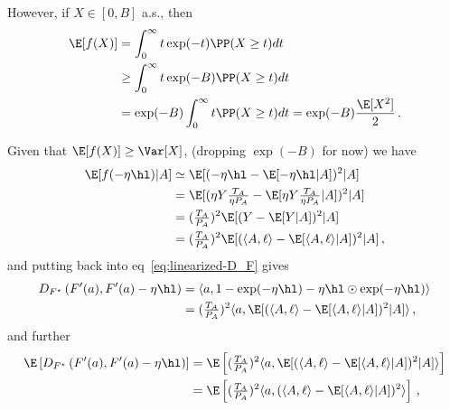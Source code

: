 However, if $X \in [0, B]$ a.s., then
\begin{align*}
    \E[f(X)]
     & = \int_0^\infty t \exp(-t) \PP(X \geq t) dt                                  \\
     & \geq \int_0^\infty t \exp(-B) \PP(X \geq t) dt                               \\
     & = \exp(-B)  \int_0^\infty t \PP(X \geq t) dt = \exp(-B) \frac{\E[X^2]}{2}\,.
\end{align*}

Given that $\E[f(X)] \geq \Var[X]$, (dropping $\exp(-B)$ for now) we have
\begin{align*}
    \E[f(-\eta \hl)|A]
     & \simeq \E[(-\eta \hl - \E[-\eta \hl|A])^2|A]                                             \\
     & =\E[(\eta Y \tfrac{T_A}{\eta P_A} - \E[\eta Y \tfrac{T_A}{\eta P_A}|A])^2|A]             \\
     & =( \tfrac{T_A}{ P_A})^2 \E[(Y - \E[Y|A])^2|A]                                            \\
     & =(\tfrac{T_A}{P_A})^2 \E[(\langle A, \ell\rangle - \E[\langle A, \ell\rangle|A])^2|A]\,,
\end{align*}
and putting back into eq~\ref{eq:linearized-D_F} gives
\begin{align*}
    D_{F^\star}\left(F'(a), F'(a) - \eta \hl\right)
     & =
    \langle a,
    1
    - \exp(-\eta \hl)
    - \eta \hl \odot \exp(-\eta \hl)
    \rangle
    \\
     & =
    (\tfrac{T_A}{P_A})^2 \langle a, \E[(\langle A, \ell\rangle - \E[\langle A, \ell\rangle|A])^2|A]
    \rangle\,,
\end{align*}
and further
\begin{align*}
    \E\left[D_{F^\star}\left(F'(a), F'(a) - \eta \hl\right)\right]
     & =
    \E\left[
        (\tfrac{T_A}{P_A})^2 \langle a, \E[(\langle A, \ell\rangle - \E[\langle A, \ell\rangle|A])^2|A]\rangle
    \right] \\
     & =
    \E\left[
        (\tfrac{T_A}{P_A})^2 \langle a, (\langle A, \ell\rangle - \E[\langle A, \ell\rangle|A])^2\rangle
        \right]
    \,,
\end{align*}




\clearpage
